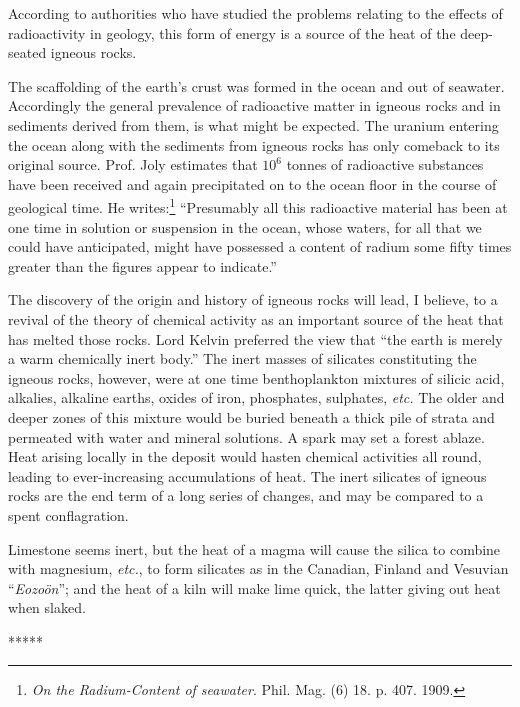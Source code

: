 \documentclass[a4paper, 12pt, oneside]{article}
\begin{document}
According to authorities who have studied the problems relating to the effects of radioactivity in geology, this form of energy is a source of the heat of the deep-seated igneous rocks.

The scaffolding of the earth's crust was formed in the ocean and out of seawater. Accordingly the general prevalence of radioactive matter in igneous rocks and in sediments derived from them, is what might be expected. The uranium entering the ocean along with the sediments from igneous rocks has only comeback to its original source. Prof. Joly estimates that $10^{6}$ tonnes of radioactive substances have been received and again precipitated on to the ocean floor in the course of geological time. He writes:\footnote{\emph{On the Radium-Content of seawater}. Phil. Mag. (6) 18. p. 407. 1909.} ``Presumably all this radioactive material has been at one time in solution or suspension in the ocean, whose waters, for all that we could have anticipated, might have possessed a content of radium some fifty times greater than the figures appear to indicate.''

The discovery of the origin and history of igneous rocks will lead, I believe, to a revival of the theory of chemical activity as an important source of the heat that has melted those rocks. Lord Kelvin preferred the view that ``the earth is merely a warm chemically inert body.'' The inert masses of silicates constituting the igneous rocks, however, were at one time benthoplankton mixtures of silicic acid, alkalies, alkaline earths, oxides of iron, phosphates, sulphates, \emph{etc.} The older and deeper zones of this mixture would be buried beneath a thick pile of strata and permeated with water and mineral solutions. A spark may set a forest ablaze. Heat arising locally in the deposit would hasten chemical activities all round, leading to ever-increasing accumulations of heat. The inert silicates of igneous rocks are the end term of a long series of changes, and may be compared to a spent conflagration.

Limestone seems inert, but the heat of a magma will cause the silica to combine with magnesium, \emph{etc.}, to form silicates as in the Canadian, Finland and Vesuvian ``\emph{Eozoön}''; and the heat of a kiln will make lime quick, the latter giving out heat when slaked.

\centerline{*\hspace{15mm}*\hspace{15mm}*\hspace{15mm}*\hspace{15mm}*}
\bigskip
\end{document}
